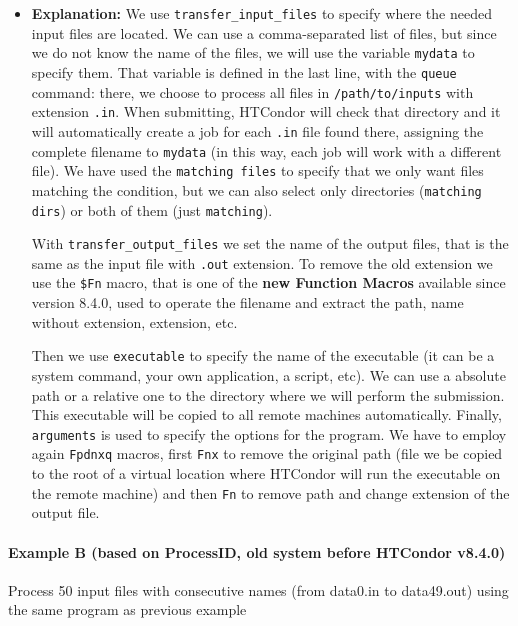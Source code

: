 \documentclass[a4paper,10pt]{article}
\begin{document}
\begin{itemize}
\item \textbf{Explanation:} 
We use \texttt{transfer\_input\_files} to specify where the needed input files are
located. We can use a comma-separated list of files, but since we do not know
the name of the files, we will use the variable \texttt{mydata} to specify them. That
variable is defined in the last line, with the \texttt{queue} command: there, we choose
to process all files in \texttt{/path/to/inputs} with extension \texttt{.in}. When submitting,
HTCondor will check that directory and it will automatically create a job for
each \texttt{.in} file found there, assigning the complete filename to \texttt{mydata} (in
this way, each job will work with a different file). We have used the \texttt{matching
  files} to specify that we only want files matching the condition, but we can
also select only directories (\texttt{matching dirs}) or both of them (just
\texttt{matching}).

With \texttt{transfer\_output\_files} we set the name of the output files, that is the
same as the input file with \texttt{.out} extension. To remove the old extension we use
the \texttt{\$Fn} macro, that is one of the \textbf{new Function Macros}
available since version 8.4.0, used to operate the filename and extract the
path, name without extension, extension, etc.

Then we use \texttt{executable} to specify the name of the executable (it can be a
system command, your own application, a script, etc). We can use a absolute path
or a relative one to the directory where we will perform the submission. This
executable will be copied to all remote machines automatically. Finally,
\texttt{arguments} is used to specify the options for the program. We have to employ
again \texttt{Fpdnxq} macros, first \texttt{Fnx} to remove the original path (file we be
copied to the root of a virtual location where HTCondor will run the executable
on the remote machine) and then \texttt{Fn} to remove path and change extension of the
output file.
\end{itemize}


\paragraph{\textbf{Example B} (based on ProcessID, old system before HTCondor v8.4.0)}
\label{sec:org2ec2166}

Process 50 input files with consecutive names (from data0.in to data49.out)
using the same program as previous example
\end{document}

